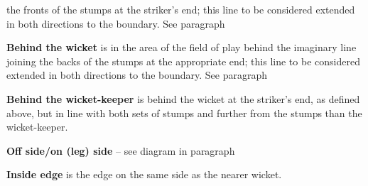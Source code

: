 \documentclass[12pt]{article}
\begin{document}
\vspace{\baselineskip}
\begin{adjustwidth}{0.4in}{0.42in}
{\fontsize{9pt}{10.8pt}\selectfont the fronts of the stumps at the striker’s end; this line to be considered extended in both directions to the boundary. See paragraph \par}\par

\end{adjustwidth}


\vspace{\baselineskip}
\begin{adjustwidth}{0.4in}{0.1in}
\begin{justify}
{\fontsize{9pt}{10.8pt} \tabto{0.39in} \textbf{Behind the wicket }is in the area of the field of play behind the imaginary line joining the backs of the stumps\textbf{ }at the appropriate end; this line to be considered extended in both directions to the boundary. See paragraph \par}
\end{justify}\par

\end{adjustwidth}


\vspace{\baselineskip}
\begin{adjustwidth}{0.4in}{0.25in}
{\fontsize{9pt}{10.8pt} \tabto{0.39in} \textbf{Behind the wicket-keeper }is behind the wicket at the striker’s end, as defined above, but in line with both\textbf{ }sets of stumps and further from the stumps than the wicket-keeper.\par}\par

\end{adjustwidth}


\vspace{\baselineskip}
{\fontsize{9pt}{10.8pt} \tabto{0.39in} {\fontsize{8pt}{9.6pt}\selectfont \textbf{Off side/on (leg) side }–\textbf{ }see diagram in paragraph \par}\par}\par


\vspace{\baselineskip}
{\fontsize{9pt}{10.8pt} \tabto{0.39in} {\fontsize{8pt}{9.6pt}\selectfont \textbf{Inside edge }is the edge on the same side as the nearer wicket.\par}\par}\par
\end{document}
